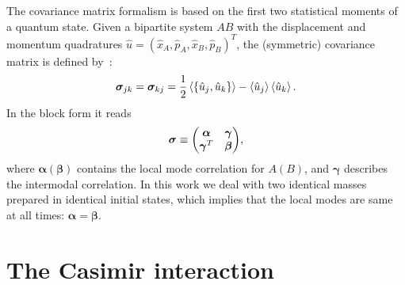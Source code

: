 \documentclass[aps,prd,reprint,superscriptaddress,nofootinbib,floatfix]{revtex4-2}
\begin{document}
The covariance matrix formalism is based on the first two statistical moments of a quantum state. Given a bipartite system $AB$ with the displacement and momentum quadratures $ \hat u = ( \hat x_A, \hat p_A, \hat x_B, \hat p_B)^T$, the (symmetric) covariance matrix is defined by~\cite{Negativity-Vidal2002,Negativity-CV-Serafini2004,Negativity-Gaussian-Adesso2005}:
\begin{equation}
\bm{\sigma}_{jk} = \bm{\sigma}_{kj}  = \frac{1}{2} \ev{ \acomm{\hat u_j}{\hat u_k} }  -  \ev{ \hat u_j }\ev{ \hat u_k } .
\end{equation}
In the block form it reads
\begin{equation}
    \bm{\sigma} \equiv \mqty(
\bm{\alpha} & \bm{\gamma} \\
\bm{\gamma}^T & \bm{\beta}
),
\end{equation}
where $\bm{\alpha}(\bm{\beta})$ contains the local mode correlation for $A(B)$, and $\bm{\gamma}$ describes the intermodal correlation. 
In this work we deal with two identical masses prepared in identical initial states, which implies that the local modes are same at all times: $\bm{\alpha} = \bm{\beta}$.



\section*{The Casimir interaction}
\end{document}
